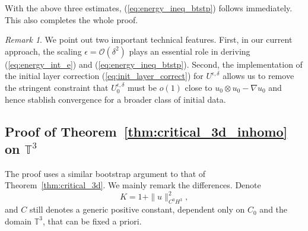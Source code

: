 \documentclass[reqno,10pt]{amsart}
\theoremstyle{definition}
\theoremstyle{remark}
\newtheorem{remark}[theorem]{Remark}
\numberwithin{equation}{section}
\begin{document}
With the above three estimates, (\ref{eq:energy_ineq_btstp}) follows immediately. This also completes the whole proof.

\begin{remark}
We point out two important technical features. First, in our current approach, the scaling $\epsilon=\mathcal O(\delta^2)$ plays an essential role in deriving (\ref{eq:energy_int_e}) and (\ref{eq:energy_ineq_btstp}). Second, the implementation of the initial layer correction (\ref{eq:init_layer_correct}) for $U^{\epsilon,\delta}$ allows us to remove the stringent constraint that $U^{\epsilon,\delta}_0$ must be $o(1)$ close to $u_0 \otimes u_0 - \nabla u_0$ and hence stablish convergence for a broader class of initial data.
\end{remark}

\subsection{Proof of Theorem~\ref{thm:critical_3d_inhomo} on $\mathbb T^3$} \label{subsec:thm:critical_3d_inhomo}

The proof uses a similar bootstrap argument to that of Theorem~\ref{thm:critical_3d}. We mainly remark the differences. Denote 
\[
    K=1+\|u\|_{C^0H^3}^2,
\]
and $C$ still denotes a generic positive constant, dependent only on $C_0$ and the domain $\mathbb T^3$, that can be fixed a priori.
\end{document}
